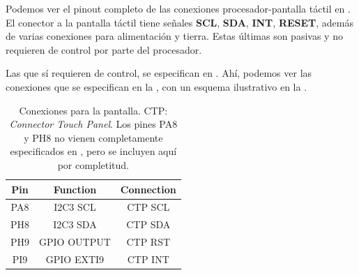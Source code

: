 \documentclass[../main.tex]{subfiles}
\begin{document}
            Podemos ver el pinout completo de las conexiones procesador-pantalla táctil en \BRDMAN[6.8]. El conector a la pantalla táctil tiene señales \textbf{SCL}, \textbf{SDA}, \textbf{INT}, \textbf{RESET}, además de varias conexiones para alimentación y tierra. Estas últimas son pasivas y no requieren de control por parte del procesador.

            Las que sí requieren de control, se especifican en \BRDMAN[Appendix A]. Ahí, podemos ver las conexiones que se especifican en la , con un esquema ilustrativo en la .

            \begin{table}[h]
                \centering
                \begin{tabular}{c|c|c}
                    Pin & Function & Connection \\\hline\hline
                    PA8 & I2C3 SCL & CTP SCL \\
                    PH8 & I2C3 SDA & CTP SDA \\
                    PH9 & GPIO OUTPUT & CTP RST \\ 
                    PI9 & GPIO EXTI9 & CTP INT \\
                \end{tabular}
                \caption{Conexiones para la pantalla. CTP: \emph{Connector Touch Panel}. Los pines PA8 y PH8 no vienen completamente especificados en \BRDMAN, pero se incluyen aquí por completitud.}
                \label{tab:ctp_conn}
            \end{table}
\end{document}
